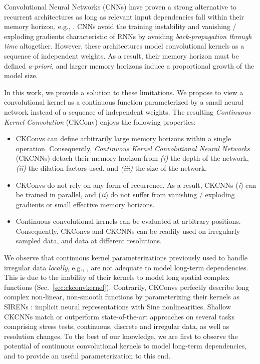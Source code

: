 \documentclass{article}
\begin{document}
Convolutional Neural Networks (CNNs) \citep{lecun1998gradient} have proven a strong alternative to recurrent architectures as long as relevant input dependencies fall within their memory horizon, e.g., \citet{conneau2016very, oord2016wavenet, dai2017very, dauphin2017language, bai2018empirical}. CNNs avoid the training instability and vanishing / exploding gradients characteristic of RNNs by avoiding \textit{back-propagation through time} \citep{werbos1990backpropagation} altogether.
However, these architectures model convolutional kernels as a sequence of independent weights. As a result, their memory horizon must be defined \textit{a-priori}, and larger memory horizons induce a proportional growth of the model size.

In this work, we provide a solution to these limitations. We propose to view a convolutional kernel as a continuous function parameterized by a small neural network instead of a sequence of independent weights. The resulting \textit{Continuous Kernel Convolution} (CKConv) enjoys the following properties:
\begin{itemize}[topsep=0pt, leftmargin=*]
    \item CKConvs can define arbitrarily large memory horizons within a single operation. Consequently, \textit{Continuous Kernel Convolutional Neural Networks} (CKCNNs) detach their memory horizon from \emph{(i)} the depth of the network, \emph{(ii)} the dilation factors used, and \emph{(iii)} the size of the network. 
    \item CKConvs do not rely on any form of recurrence. As a result, CKCNNs (\textit{i}) can be trained in parallel, and (\textit{ii}) do not suffer from vanishing / exploding gradients or small effective memory horizons.
    \item Continuous convolutional kernels can be evaluated at arbitrary positions. Consequently, CKConvs and CKCNNs can be readily used on irregularly sampled data, and data at different resolutions.
\end{itemize}
We observe that continuous kernel parameterizations previously used to handle irregular data \textit{locally}, e.g., \citet{schutt2017schnet, wu2019pointconv}, are not adequate to model long-term dependencies. This is due to the inability of their kernels to model long spatial complex functions (Sec.~\ref{sec:ckconvkernel}). Contrarily, CKConvs perfectly describe long complex non-linear, non-smooth functions by parameterizing their kernels as SIRENs \citep{sitzmann2020implicit}: implicit neural representations with $\mathrm{Sine}$ nonlinearities. Shallow CKCNNs match or outperform state-of-the-art approaches on several tasks comprising stress tests, continuous, discrete and irregular data, as well as resolution changes. To the best of our knowledge, we are first to observe the potential of continuous convolutional kernels to model long-term dependencies, and to provide an useful parameterization to this end.
\end{document}
